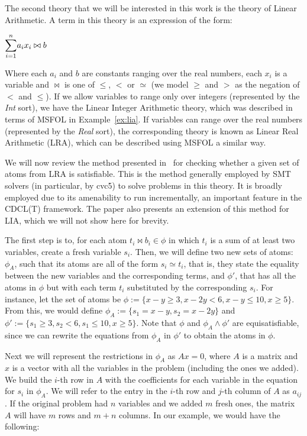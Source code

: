 The second theory that we will be interested in this work is the theory of Linear Arithmetic. A term in this theory is an expression of the form:
\begin{center}
  $\mathlarger{\sum}_{i = 1}^{n} a_{i} x_{i} \bowtie b$
\end{center}

Where each $a_{i}$ and $b$ are constants ranging over the real numbers, each $x_{i}$ is a variable and $\bowtie$ is one of $\le$, $<$ or $\simeq$ (we model $\ge$ and $>$ as the negation of $<$ and $\le$). If we allow variables to range only over integers (represented by the \textit{Int} sort), we have the Linear Integer Arithmetic theory, which was described in terms of MSFOL in Example~\ref{ex:lia}. If variables can range over the real numbers (represented by the \textit{Real} sort), the corresponding theory is known as Linear Real Arithmetic (LRA), which can be described using MSFOL a similar way.

We will now review the method presented in~\cite{simplex_dpllt} for checking whether a given set of atoms from LRA is satisfiable. This is the method generally employed by SMT solvers (in particular, by cvc5) to solve problems in this theory. It is broadly employed due to its amenability to run incrementally, an important feature in the CDCL(T) framework. The paper also presents an extension of this method for LIA, which we will not show here for brevity.

The first step is to, for each atom $t_{i} \bowtie b_{i} \in \phi$ in which $t_{i}$ is a sum of at least two variables, create a fresh variable $s_{i}$. Then, we will define two new sets of atoms: $\phi_{A}$, such that its atoms are all of the form $s_{i} \simeq t_{i}$, that is, they state the equality between the new variables and the corresponding terms, and $\phi'$, that has all the atoms in $\phi$ but with each term $t_{i}$ substituted by the corresponding $s_{i}$. For instance, let the set of atoms be
$\phi := \{x - y \ge 3, x - 2y < 6, x - y \le 10, x \ge 5\}$.  From this, we would define $\phi_{A} := \{s_{1} = x - y, s_{2} = x - 2y\}$ and $\phi' := \{s_{1} \ge 3, s_{2} < 6, s_{1} \le 10, x \ge 5\}$. Note that $\phi$ and $\phi_{A} \wedge \phi'$ are equisatisfiable, since we can rewrite the equations from $\phi_{A}$ in $\phi'$ to obtain the atoms in $\phi$.

Next we will represent the restrictions in $\phi_{A}$ as $Ax = 0$, where $A$ is a matrix and $x$ is a vector with all the variables in the problem (including the ones we added). We build the $i$-th row in $A$ with the coefficients for each variable in the equation for $s_{i}$ in $\phi_{A}$. We will refer to the entry in the $i$-th row and $j$-th column of $A$ as $a_{ij}$. If the original problem had $n$ variables and we added $m$ fresh ones, the matrix $A$ will have $m$ rows and $m + n$ columns. In our example, we would have the following:

